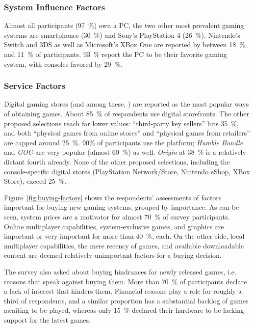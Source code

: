\subsubsection{System Influence Factors}
Almost all participants (\SI{97}{\percent}) own a PC, the two other most prevalent
gaming systems are smartphones (\SI{30}{\percent}) and Sony's PlayStation 4 (\SI{26}{\percent}).
Nintendo's Switch and 3DS as well as Microsoft's XBox One are reported
by between \SI{18}{\percent} and \SI{11}{\percent} of participants.
\SI{93}{\percent} report the PC to be their favorite gaming system, with consoles
favored by \SI{29}{\percent}.



\subsubsection{Service Factors}

Digital gaming stores (and among these, \steam) are reported as
the most popular ways of obtaining games. About \SI{85}{\percent} of respondents
use digital storefronts. The other proposed selections reach far lower
values: ``third-party key sellers'' hits \SI{35}{\percent}, and both ``physical
games from online stores'' and ``physical games from retailers''
are capped around \SI{25}{\percent}.
90\% of participants use the \steam platform; \textit{Humble Bundle}
and \textit{GOG} are very popular (almost \SI{60}{\percent}) as well. \textit{Origin}
at \SI{38}{\percent} is a relatively distant fourth already. None of the other
proposed selections, including the console-specific digital stores
(PlayStation Network/Store, Nintendo eShop, XBox Store), exceed
\SI{25}{\percent}.

Figure~\ref{fig:buying-factors} shows the respondents' assessments
of factors important for buying new gaming systems, grouped by
importance. As can be seen, system prices are a motivator for
almost \SI{70}{\percent} of survey participants. Online multiplayer capabilities,
system-exclusive games, and graphics are important or very important
for more than \SI{40}{\percent}, each. On the other side, local multiplayer
capabilities, the mere recency of games, and available downloadable
content are deemed relatively unimportant factors for a buying decision.

The survey also asked about buying hindrances for newly released 
games, i.e. reasons that speak against buying them.
More than \SI{70}{\percent} of participants declare a lack of interest
that hinders them. Financial reasons play a role for roughly
a third of respondents, and a similar proportion has a substantial
backlog of games awaiting to be played, whereas only \SI{15}{\percent} declared
their hardware to be lacking support for the latest games.


